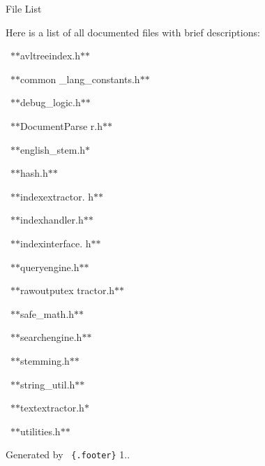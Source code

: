 File List











Here is a list of all documented files with brief descriptions\+:







  {\tt }$\ast$$\ast$avltreeindex.h$\ast$$\ast$

  {\tt }$\ast$$\ast$common \+\_\+lang\+\_\+constants.\+h$\ast$$\ast$

  {\tt }$\ast$$\ast$debug\+\_\+logic.h$\ast$$\ast$

  {\tt }$\ast$$\ast$\+Document\+Parse r.\+h$\ast$$\ast$

  {\tt }$\ast$$\ast$english\+\_\+stem.h$\ast$
\begin{DoxyItemize}
\item 
\end{DoxyItemize}

  {\tt }$\ast$$\ast$hash.h$\ast$$\ast$

  {\tt }$\ast$$\ast$indexextractor. h$\ast$$\ast$

  {\tt }$\ast$$\ast$indexhandler.h$\ast$$\ast$

  {\tt }$\ast$$\ast$indexinterface. h$\ast$$\ast$

  {\tt }$\ast$$\ast$queryengine.h$\ast$$\ast$

  {\tt }$\ast$$\ast$rawoutputex tractor.\+h$\ast$$\ast$

  {\tt }$\ast$$\ast$safe\+\_\+math.h$\ast$$\ast$

  {\tt }$\ast$$\ast$searchengine.h$\ast$$\ast$

  {\tt }$\ast$$\ast$stemming.h$\ast$$\ast$

  {\tt }$\ast$$\ast$string\+\_\+util.h$\ast$$\ast$

  {\tt }$\ast$$\ast$textextractor.h$\ast$
\begin{DoxyItemize}
\item 
\end{DoxyItemize}

  {\tt }$\ast$$\ast$utilities.h$\ast$$\ast$ 





 



Generated by  {\tt \{.footer\}} 1.. 